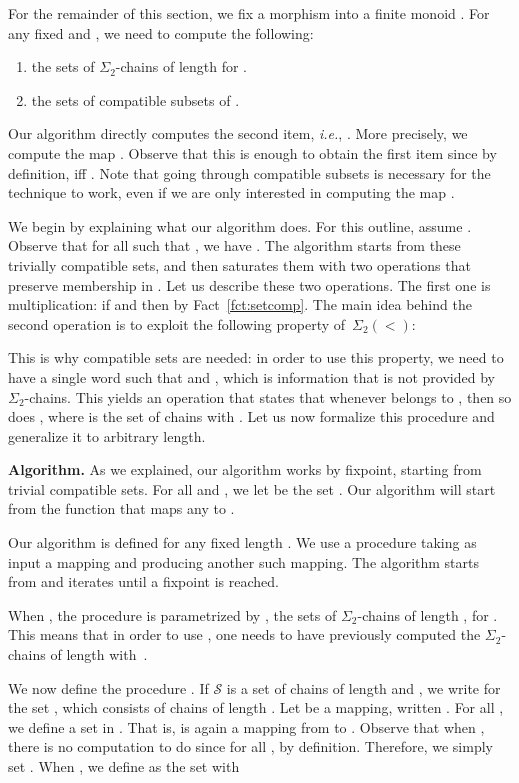 \documentclass[envcountsame]{llncs}
\newcommand\Ss{\ensuremath{\mathcal{S}}\xspace}
\newcommand{\sic}[1]{\ensuremath{\Sigma_{#1}}\xspace}
\newcommand{\siwd}{\ensuremath{\Sigma_{2}(<)}\xspace}
\newcommand\chains{chains\xspace}
\newcommand\qchains[1]{\ensuremath{\sic{#1}}-chains\xspace}
\newcommand\dchains{\qchains{2}}
\begin{document}
For the remainder of this section, we fix a morphism  into a finite monoid . For any fixed 
and , we need to compute the following:

\begin{enumerate}
  \itemsep1ex
\item the sets  of \dchains of length  for
  . 
\item the sets  of compatible subsets of
  .
\end{enumerate}

Our algorithm directly computes the second item, \emph{i.e.},
. More precisely, we compute the map . Observe that this is enough to obtain
the first item since by definition, 
iff . Note that going through
compatible subsets is necessary for the technique to work, even if we
are only interested in computing the map .

\medskip
{} We begin by explaining what our algorithm does. For
this outline, assume . Observe that for all  such that
, we have . The algorithm starts from these trivially compatible sets,
and then saturates them with two operations that preserve membership
in . Let us describe these two operations. The first one is
multiplication: if  and 
then  by
Fact~\ref{fct:setcomp}. The main idea behind the second operation is to
exploit the following property of~\siwd:

This is why compatible sets are needed: in order to use this property,
we need to have a single word  such that  and , which is information that is not provided by \dchains. This
yields an operation that states that whenever  belongs to ,
then so does , where  is the set of
\chains  with . Let us now formalize
this procedure and generalize it to arbitrary length.

\medskip
\noindent
{\bf Algorithm.} As we explained, our algorithm works by fixpoint,
starting from trivial compatible sets. For all  and , we let  be the set . Our algorithm will start from the function 
that maps any  to .

Our algorithm is defined for any fixed length .  We use a procedure
 taking as input a mapping  and producing another such
mapping.  The algorithm starts from  and iterates  
until a fixpoint is reached.

When , the procedure  is parametrized by
, the sets of \dchains of length , for . This means that in order to use , one needs to have
previously computed the \dchains of length  with~.

\medskip
We now define the procedure . If \Ss is a set of \chains of
length  and , we write  for the set
, which consists of
\chains of length . Let  be a mapping, written . For all , we define a set
 in . That is,  is again a mapping from
 to .
Observe that when ,
there is no computation to do since for all ,  by definition. Therefore, we simply set . When , we define  as the set  with
\end{document}
